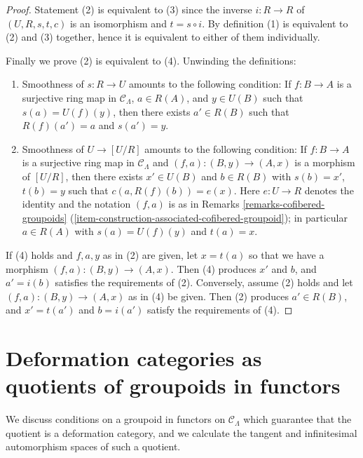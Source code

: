 \documentclass{stacks-project}
\theoremstyle{plain}
\theoremstyle{definition}
\theoremstyle{remark}
\numberwithin{equation}{subsection}
\begin{document}
\begin{proof}
Statement (2) is equivalent to (3) since the inverse $i: R \to R$ of
$(U, R, s, t, c)$ is an isomorphism and $t = s \circ i$. By definition (1) is
equivalent to (2) and (3) together, hence it is equivalent to either of them
individually.

\medskip\noindent
Finally we prove (2) is equivalent to (4). Unwinding the definitions:
\begin{enumerate}
\item[(2)] Smoothness of $s: R \to U$ amounts to the following
condition: If $f: B \to A$ is a surjective ring map in
$\mathcal{C}_\Lambda$, $a \in R(A)$, and $y \in U(B)$ such that
$s(a) = U(f)(y)$, then there exists $a' \in R(B)$ such that
$R(f)(a') = a$ and $s(a') = y$.
\item[(4)] Smoothness of $U \to [U/R]$ amounts to the following
condition: If $f: B \to A$ is a surjective ring map in
$\mathcal{C}_\Lambda$ and $(f, a) : (B, y) \to (A, x)$
is a morphism of $[U/R]$, then there exists $x' \in U(B)$ and
$b \in R(B)$ with $s(b) = x'$, $t(b) = y$
such that $c(a, R(f)(b)) = e(x)$.  Here $e : U \to R$ denotes the
identity and the notation $(f, a)$ is as in Remarks
\ref{remarks-cofibered-groupoids}
(\ref{item-construction-associated-cofibered-groupoid});
in particular $a \in R(A)$ with $s(a) = U(f)(y)$ and $t(a) = x$.
\end{enumerate}
If (4) holds and $f, a, y$ as in (2) are given, let $x = t(a)$ so that
we have a morphism $(f, a): (B, y) \to (A, x)$.
Then (4) produces $x'$ and $b$, and $a' = i(b)$ satisfies the requirements
of (2). Conversely, assume (2) holds and let $(f, a): (B, y) \to (A, x)$
as in (4) be given. Then (2) produces $a' \in R(B)$, and $x' = t(a')$ and
$b = i(a')$ satisfy the requirements of (4).
\end{proof}





\section{Deformation categories as quotients of groupoids in functors}
\label{section-deformation-categories-as-quotients}

\noindent
We discuss conditions on a groupoid in functors on $\mathcal{C}_\Lambda$ which
guarantee that the quotient is a deformation category, and we calculate the
tangent and infinitesimal automorphism spaces of such a quotient.
\end{document}

